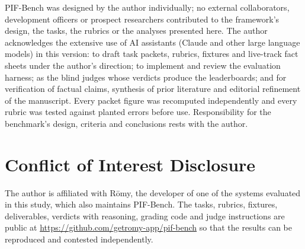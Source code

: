 \documentclass[11pt,a4paper]{article}
\newcommand{\romy}{R\={o}my}
\begin{document}
PIF-Bench was designed by the author individually; no external collaborators, development officers or prospect researchers contributed to the framework's design, the tasks, the rubrics or the analyses presented here. The author acknowledges the extensive use of AI assistants (Claude and other large language models) in this version: to draft task packets, rubrics, fixtures and live-track fact sheets under the author's direction; to implement and review the evaluation harness; as the blind judges whose verdicts produce the leaderboards; and for verification of factual claims, synthesis of prior literature and editorial refinement of the manuscript. Every packet figure was recomputed independently and every rubric was tested against planted errors before use. Responsibility for the benchmark's design, criteria and conclusions rests with the author.

\section*{Conflict of Interest Disclosure}

The author is affiliated with \romy, the developer of one of the systems evaluated in this study, which also maintains PIF-Bench. The tasks, rubrics, fixtures, deliverables, verdicts with reasoning, grading code and judge instructions are public at \url{https://github.com/getromy-app/pif-bench} so that the results can be reproduced and contested independently.
\end{document}
